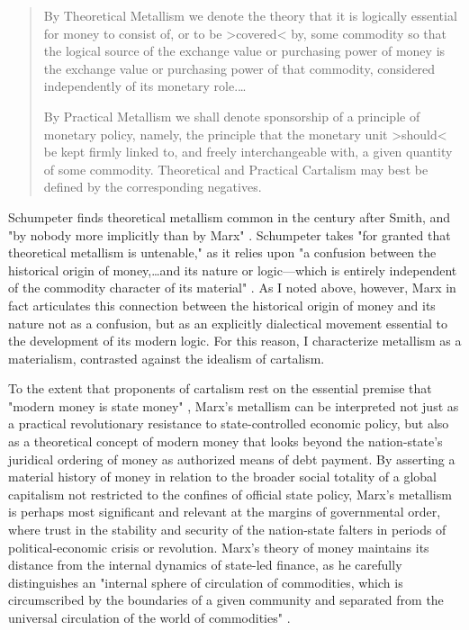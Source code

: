\blockcquote[274--5]{Schumpeter1954-gi}{
  By Theoretical Metallism we denote the theory that it is logically essential for money to consist of, or to be >covered< by, some commodity so that the logical source of the exchange value or purchasing power of money is the exchange value or purchasing power of that commodity, considered independently of its monetary role.…
  
  By Practical Metallism we shall denote sponsorship of a principle of monetary policy, namely, the principle that the monetary unit >should< be kept firmly linked to, and freely interchangeable with, a given quantity of some commodity. Theoretical and Practical Cartalism may best be defined by the corresponding negatives.
}
Schumpeter finds theoretical metallism common in the century after Smith, and "by nobody more implicitly than by Marx" \autocite[276]{Schumpeter1954-gi}. Schumpeter takes "for granted that theoretical metallism is untenable," as it relies upon "a confusion between the historical origin of money,…and its nature or logic---which is entirely independent of the commodity character of its material" \autocite[276]{Schumpeter1954-gi}. As I noted above, however, Marx in fact articulates this connection between the historical origin of money and its nature not as a confusion, but as an explicitly dialectical movement essential to the development of its modern logic. For this reason, I characterize metallism as a materialism, contrasted against the idealism of cartalism.

To the extent that proponents of cartalism rest on the essential premise that "modern money is state money" \autocite[77]{Tcherneva08}, Marx's metallism can be interpreted not just as a practical revolutionary resistance to state-controlled economic policy, but also as a theoretical concept of modern money that looks beyond the nation-state's juridical ordering of money as authorized means of debt payment. By asserting a material history of money in relation to the broader social totality of a global capitalism not restricted to the confines of official state policy, Marx's metallism is perhaps most significant and relevant at the margins of governmental order, where trust in the stability and security of the nation-state falters in periods of political-economic crisis or revolution. Marx's theory of money maintains its distance from the internal dynamics of state-led finance, as he carefully distinguishes an "internal sphere of circulation of commodities, which is circumscribed by the boundaries of a given community and separated from the universal circulation of the world of commodities" \autocite*[ch.~2.2.c]{MarxCPE}.

